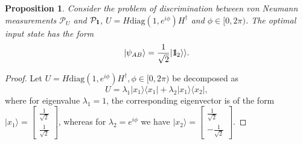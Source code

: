 \documentclass[preprint,12pt, a4paper]{elsarticle}
\newcommand{\ket}[1]{\ensuremath{|#1\rangle}}
\newcommand{\bra}[1]{\ensuremath{\langle#1|}}
\newcommand{\ketbra}[2]{\ensuremath{\ket{#1}\bra{#2}}}
\newcommand{\1}{{\rm 1\hspace{-0.9mm}l}}
\newcommand{\Id}{{\rm 1\hspace{-0.9mm}l}}
\newcommand{\PP}{\mathcal{P}}
\newcommand{\diag}{\mathrm{diag}}
\newtheorem{proposition}{Proposition}
\begin{document}
\begin{proposition}\label{prop-discrim}
Consider the problem of discrimination between von Neumann measurements $\PP_U$ 
and $\PP_\1$, $U = H\diag(1, e^{i \phi}) H^\dagger $ and $\phi \in [0, 
2\pi)$.  The optimal input state has the form
\begin{equation}
\ket{\psi_{AB}} = \frac{1}{\sqrt{2}} |\Id_2 \rangle \rangle.
\end{equation}
\end{proposition}

\begin{proof}
Let $U = H\diag(1, e^{i \phi}) H^\dagger, \phi \in [0, 
2\pi)$ be decomposed as 
	\begin{equation}
	U= \lambda_1 \ketbra{x_1}{x_1} + \lambda_2 \ketbra{x_1}{x_2}, 
	\end{equation}
	where  for eigenvalue $\lambda_1 = 1$, the corresponding 
	eigenvector is 
	of the form $\ket{x_1} = \left[\begin{array}{c}\frac{1}{\sqrt{2}}\\\frac{1}{\sqrt{2}}\end{array}\right]
	$,
	whereas for  $\lambda_2 = e^{i \phi}$ we have $\ket{x_2} = \left[\begin{array}{c}\frac{1}{\sqrt{2}}\\-\frac{1}{\sqrt{2}}\end{array}\right] 
	$.
	

\end{proof}
\end{document}
